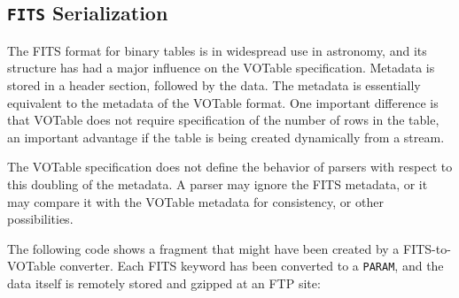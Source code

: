 \documentclass[11pt,a4paper]{ivoa}
\let\fg=\color
\def\elem#1{{\tt{\fg{DarkRed}#1}}}
\begin{document}
{\subsection{\elem{FITS} Serialization}
\label{sec:FITS}
\label{elem:FITS}

The FITS format for binary tables \citep{std:FITS}
is in widespread use in astronomy,
and its structure has had a major influence on the VOTable specification.
Metadata is stored in a header section, followed by the data. The
metadata is essentially equivalent to the metadata of the VOTable
format. One important difference is that VOTable does not require
specification of the number of rows in the table, an important
advantage if the table is being created dynamically from a stream.

The VOTable specification does not define the behavior of parsers
with respect to this doubling of the metadata. A parser may ignore
the FITS metadata, or it may compare it with the VOTable metadata for
consistency, or other possibilities.

The following code shows a fragment that might have been created
by a FITS-to-VOTable converter. Each FITS keyword has been converted
to a \elem{PARAM}, and the data itself is remotely stored and gzipped at an
FTP site:

}
\end{document}
